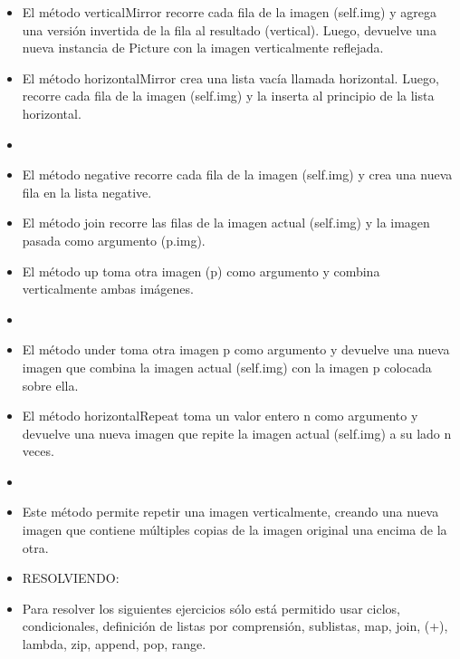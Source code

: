 \documentclass{article}
\begin{document}
\begin{itemize}
        \item El método verticalMirror recorre cada fila de la imagen (self.img) y agrega una versión invertida de la fila al resultado (vertical). Luego, devuelve una nueva instancia de Picture con la imagen verticalmente reflejada.    
        \item El método horizontalMirror crea una lista vacía llamada horizontal. Luego, recorre cada fila de la imagen (self.img) y la inserta al principio de la lista horizontal.
        \item[ ]{}

        \item El método negative recorre cada fila de la imagen (self.img) y crea una nueva fila en la lista negative.
        \item El método join recorre las filas de la imagen actual (self.img) y la imagen pasada como argumento (p.img).
        \item El método up toma otra imagen (p) como argumento y combina verticalmente ambas imágenes.
        \item[ ]{}

        \item El método under toma otra imagen p como argumento y devuelve una nueva imagen que combina la imagen actual (self.img) con la imagen p colocada sobre ella.
        \item El método horizontalRepeat toma un valor entero n como argumento y devuelve una nueva imagen que repite la imagen actual (self.img) a su lado n veces.
        \item[ ]{}

        \item Este método permite repetir una imagen verticalmente, creando una nueva imagen que contiene múltiples copias de la imagen original una encima de la otra.
         \item[ ]{}
         
        RESOLVIENDO:

        \item Para resolver los siguientes ejercicios sólo está permitido usar ciclos, condicionales, definición de listas por comprensión, sublistas, map, join, (+), lambda, zip, append, pop, range.
        

\end{itemize}
\end{document}
